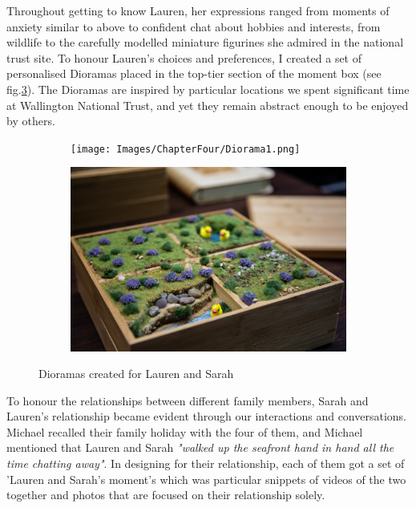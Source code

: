 Throughout getting to know Lauren, her expressions ranged from moments of anxiety similar to above to confident chat about hobbies and interests, from wildlife to the carefully modelled miniature figurines she admired in the national trust site. To honour Lauren's choices and preferences, I created a set of personalised Dioramas placed in the top-tier section of the moment box (see fig.\ref{fig:Dioramas}). The Dioramas are inspired by particular locations we spent significant time at Wallington National Trust, and yet they remain abstract enough to be enjoyed by others.


\begin{figure}
\centering
\begin{subfigure}{.5\textwidth}
  \centering
  \texttt{[image: Images/ChapterFour/Diorama1.png]}
  \label{fig:DiroamaOne}
\end{subfigure}%
\begin{subfigure}{.5\textwidth}
  \centering
  \includegraphics[width=.8\linewidth]{Images/ChapterFour/Diroama2.png}
  \label{fig:DiroamaTwo}
\end{subfigure}
\caption{Dioramas created for Lauren and Sarah}
\label{fig:Dioramas}
\end{figure}

To honour the relationships between different family members, Sarah and Lauren's relationship became evident through our interactions and conversations. Michael recalled their family holiday with the four of them, and Michael mentioned that Lauren and Sarah \textit{"walked up the seafront hand in hand all the time chatting away"}. In designing for their relationship, each of them got a set of 'Lauren and Sarah's moment's which was particular snippets of videos of the two together and photos that are focused on their relationship solely.

